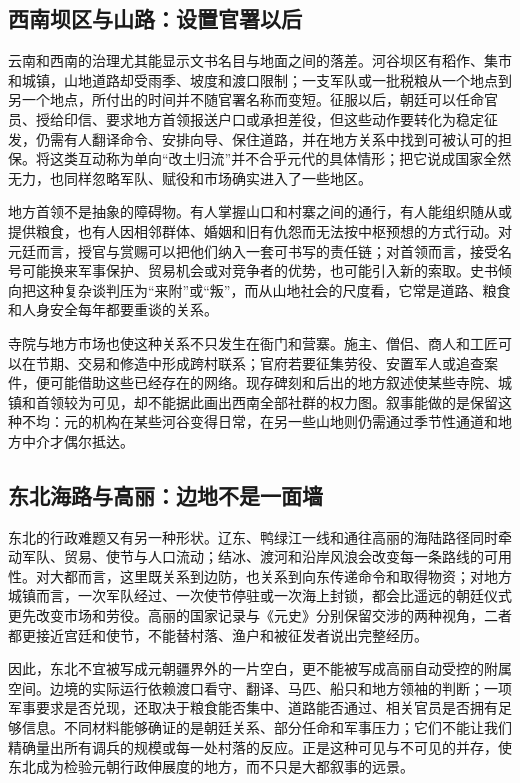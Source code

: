 \subsection{西南坝区与山路：设置官署以后}

云南和西南的治理尤其能显示文书名目与地面之间的落差。河谷坝区有稻作、集市和城镇，山地道路却受雨季、坡度和渡口限制；一支军队或一批税粮从一个地点到另一个地点，所付出的时间并不随官署名称而变短。征服以后，朝廷可以任命官员、授给印信、要求地方首领报送户口或承担差役，但这些动作要转化为稳定征发，仍需有人翻译命令、安排向导、保住道路，并在地方关系中找到可被认可的担保。将这类互动称为单向“改土归流”并不合乎元代的具体情形；把它说成国家全然无力，也同样忽略军队、赋役和市场确实进入了一些地区。

地方首领不是抽象的障碍物。有人掌握山口和村寨之间的通行，有人能组织随从或提供粮食，也有人因相邻群体、婚姻和旧有仇怨而无法按中枢预想的方式行动。对元廷而言，授官与赏赐可以把他们纳入一套可书写的责任链；对首领而言，接受名号可能换来军事保护、贸易机会或对竞争者的优势，也可能引入新的索取。史书倾向把这种复杂谈判压为“来附”或“叛”，而从山地社会的尺度看，它常是道路、粮食和人身安全每年都要重谈的关系。

寺院与地方市场也使这种关系不只发生在衙门和营寨。施主、僧侣、商人和工匠可以在节期、交易和修造中形成跨村联系；官府若要征集劳役、安置军人或追查案件，便可能借助这些已经存在的网络。现存碑刻和后出的地方叙述使某些寺院、城镇和首领较为可见，却不能据此画出西南全部社群的权力图。叙事能做的是保留这种不均：元的机构在某些河谷变得日常，在另一些山地则仍需通过季节性通道和地方中介才偶尔抵达。

\subsection{东北海路与高丽：边地不是一面墙}

东北的行政难题又有另一种形状。辽东、鸭绿江一线和通往高丽的海陆路径同时牵动军队、贸易、使节与人口流动；结冰、渡河和沿岸风浪会改变每一条路线的可用性。对大都而言，这里既关系到边防，也关系到向东传递命令和取得物资；对地方城镇而言，一次军队经过、一次使节停驻或一次海上封锁，都会比遥远的朝廷仪式更先改变市场和劳役。高丽的国家记录与《元史》分别保留交涉的两种视角，二者都更接近宫廷和使节，不能替村落、渔户和被征发者说出完整经历。

因此，东北不宜被写成元朝疆界外的一片空白，更不能被写成高丽自动受控的附属空间。边境的实际运行依赖渡口看守、翻译、马匹、船只和地方领袖的判断；一项军事要求是否兑现，还取决于粮食能否集中、道路能否通过、相关官员是否拥有足够信息。不同材料能够确证的是朝廷关系、部分任命和军事压力；它们不能让我们精确量出所有调兵的规模或每一处村落的反应。正是这种可见与不可见的并存，使东北成为检验元朝行政伸展度的地方，而不只是大都叙事的远景。

